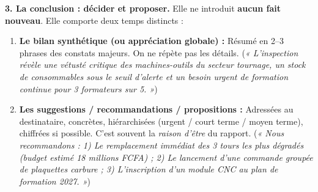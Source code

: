 \documentclass[11pt]{article}
\begin{document}
\textbf{3. La conclusion : décider et proposer.} Elle ne introduit \textbf{aucun fait nouveau}. Elle comporte deux temps distincts :
\begin{enumerate}
\item \textbf{Le bilan synthétique (ou appréciation globale) :} Résumé en 2--3 phrases des constats majeurs. On ne répète pas les détails. (\emph{« L'inspection révèle une vétusté critique des machines-outils du secteur tournage, un stock de consommables sous le seuil d'alerte et un besoin urgent de formation continue pour 3 formateurs sur 5. »})
\item \textbf{Les suggestions / recommandations / propositions :} Adressées au destinataire, concrètes, hiérarchisées (urgent / court terme / moyen terme), chiffrées si possible. C'est souvent la \emph{raison d'être} du rapport. (\emph{« Nous recommandons : 1) Le remplacement immédiat des 3 tours les plus dégradés (budget estimé 18 millions FCFA) ; 2) Le lancement d'une commande groupée de plaquettes carbure ; 3) L'inscription d'un module CNC au plan de formation 2027. »})
\end{enumerate}
\end{document}
